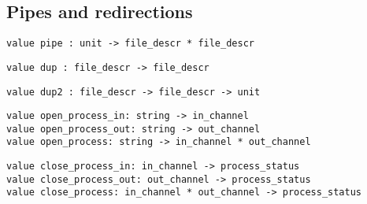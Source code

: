 \subsection*{Pipes and redirections }\begin{verbatim}
value pipe : unit -> file_descr * file_descr
\end{verbatim}
%
\begin{comment}
 Create a pipe. The first component of the result is opened
           for reading, that's the exit to the pipe. The second component is
           opened for writing, that's the entrace to the pipe. 
\end{comment}
\begin{verbatim}
value dup : file_descr -> file_descr
\end{verbatim}
%
\begin{comment}
 Duplicate a descriptor. 
\end{comment}
\begin{verbatim}
value dup2 : file_descr -> file_descr -> unit
\end{verbatim}
%
\begin{comment}
 \verbdup2 fd1 fd2 duplicates \verbfd1 to \verbfd2, closing \verbfd2 if already
           opened. 
\end{comment}
\begin{verbatim}
value open_process_in: string -> in_channel
value open_process_out: string -> out_channel
value open_process: string -> in_channel * out_channel
\end{verbatim}
%
%
%
\begin{comment}
 High-level pipe and process management. These functions
           run the given command in parallel with the program,
           and return channels connected to the standard input and/or
           the standard output of the command. The command is interpreted
           by the shell \verb/bin/sh (cf. \verbsystem). Warning: writes on channels
           are buffered, hence be careful to call \verbflush at the right times
           to ensure correct synchronization. 
\end{comment}
\begin{verbatim}
value close_process_in: in_channel -> process_status
value close_process_out: out_channel -> process_status
value close_process: in_channel * out_channel -> process_status
\end{verbatim}
%
%
%
\begin{comment}
 Close channels opened by \verbopen_process_in, \verbopen_process_out
           and \verbopen_process, respectively, wait for the associated
           command to terminate, and return its termination status. 
\end{comment}
